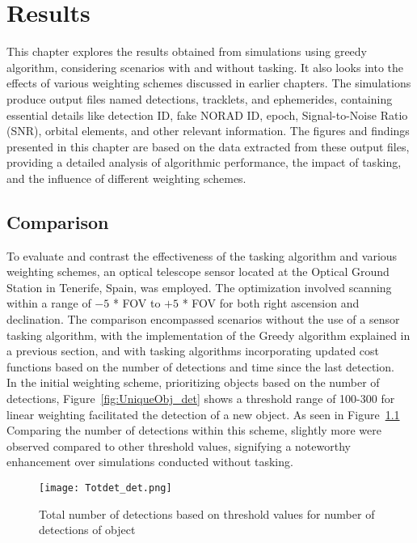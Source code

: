 \chapter{Results}
\label{sec:ergebnisse}
This chapter explores the results obtained from simulations using greedy algorithm, considering scenarios with and without tasking. It also looks into the effects of various weighting schemes discussed in earlier chapters. The simulations produce output files named detections, tracklets, and ephemerides, 
containing essential details like detection ID, fake NORAD ID, epoch, Signal-to-Noise Ratio (SNR), orbital elements, and other relevant information. The figures and findings presented in this chapter are based on the data extracted from these output files, providing a detailed analysis of algorithmic 
performance, the impact of tasking, and the influence of different weighting schemes.\\

\section{Comparison}
To evaluate and contrast the effectiveness of the tasking algorithm and various weighting schemes, an optical telescope sensor located at the Optical Ground Station in Tenerife, Spain, was employed. The optimization involved scanning within a range of $-5$ * FOV to $+5$ * FOV for both right ascension and declination. The comparison encompassed scenarios without the use of a sensor tasking algorithm, with the implementation of the Greedy algorithm explained in a previous section, and with tasking algorithms incorporating updated cost functions based on the number of detections and time since the last detection.\\

In the initial weighting scheme, prioritizing objects based on the number of detections, Figure~\ref{fig:UniqueObj_det} shows a threshold range of 100-300 for linear weighting facilitated the detection of a new object. As seen in Figure~\ref{fig:Totdet_det} Comparing the number of detections within this scheme, slightly more were observed compared to other threshold values, signifying a noteworthy enhancement over simulations conducted without tasking.\\

\begin{figure}[H]
	\centering
	\texttt{[image: Totdet\_det.png]}
	\caption{Total number of detections based on threshold values for number of detections of object}\label{fig:Totdet_det}
\end{figure}

